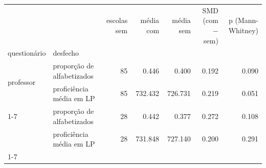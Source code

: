 \begin{tabular}{llrrrrr}
\toprule
 &  & escolas sem & média com & média sem & SMD (com − sem) & p (Mann-Whitney) \\
questionário & desfecho &  &  &  &  &  \\
\midrule
\multirow[t]{2}{*}{professor} & proporção de alfabetizados & 85 & 0.446 & 0.400 & 0.192 & 0.090 \\
 & proficiência média em LP & 85 & 732.432 & 726.731 & 0.219 & 0.051 \\
\cline{1-7}
\multirow[t]{2}{*}{diretor} & proporção de alfabetizados & 28 & 0.442 & 0.377 & 0.272 & 0.108 \\
 & proficiência média em LP & 28 & 731.848 & 727.140 & 0.200 & 0.291 \\
\cline{1-7}
\bottomrule
\end{tabular}
